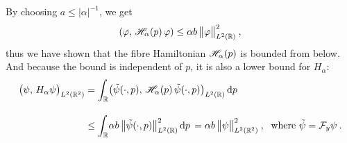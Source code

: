 By choosing $a \leq |\alpha|^{-1}$, we get
\begin{equation*}
    (\varphi, \, \mathscr{H}_\alpha(p) \, \varphi)
    \leq \alpha b \, \big\lVert \varphi \big\rVert_{L^2(\mathbb{R})}^2
    \:,
\end{equation*}
thus we have shown that the fibre Hamiltonian $\mathscr{H}_\alpha(p)$ is bounded from below. And because the bound is independent of $p$, it is also a lower bound for $H_\alpha$:
\begin{align*}
    \big(\psi, \, H_\alpha \psi\big)_{L^2(\mathbb{R}^2)}
    &= \int_{\mathbb{R}}\! \big( \tilde\psi(\cdot, p), \, \mathscr{H}_\alpha(p) \, \tilde\psi(\cdot, p) \big)_{L^2(\mathbb{R})} \, \mathrm{d}p \,
    \\[10pt]
    &\leq \int_{\mathbb{R}}\! \alpha b \, \big\lVert  \tilde\psi(\cdot, p)  \big\rVert^2_{L^2(\mathbb{R})} \, \mathrm{d}p \,
    = \alpha b \, \big\lVert \psi \big\rVert^2_{L^2(\mathbb{R}^2)} \: ,
    \; \text{ where } \tilde\psi = \mathcal{F}_y \psi \: .
    \\
\end{align*}

